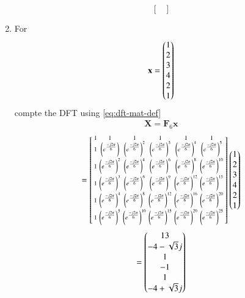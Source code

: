 \documentclass[journal,12pt,twocolumn]{IEEEtran}
\let\vec\mathbf
\renewcommand\thesection{\arabic{section}}
\begin{document}
\begin{enumerate}[label=\arabic*.,ref=\thesection.\theenumi]
\begin{equation}
\begin{bmatrix}
		\end{bmatrix}
	\end{equation}
	\item For 
	\begin{align}
		\vec{x} = \myvec{1\\2\\3\\4\\2\\1}
		\label{eq:equation1}
	\end{align}
	compte the DFT  
	using 
	\eqref{eq:dft-mat-def}\\
	\solution
	\begin{align}
		\vec{X} = \vec{F}_6 \vec{x}
	\end{align}	
	\begin{align}
		= \begin{bsmallmatrix}
			1	&	1	&	1	&	1	&	1	&	1\\
			1	&	\left(e^{\frac{-j2\pi}{6}}\right)	&	\left(e^{\frac{-j2\pi}{6}}\right)^2	&	\left(e^{\frac{-j2\pi}{6}}\right)^3	&	\left(e^{\frac{-j2\pi}{6}}\right)^4	&	\left(e^{\frac{-j2\pi}{6}}\right)^5\\
			1	&	\left(e^{\frac{-j2\pi}{6}}\right)^2	&	\left(e^{\frac{-j2\pi}{6}}\right)^4	&	\left(e^{\frac{-j2\pi}{6}}\right)^6	&	\left(e^{\frac{-j2\pi}{6}}\right)^8	&	\left(e^{\frac{-j2\pi}{6}}\right)^{10}\\
			1	&	\left(e^{\frac{-j2\pi}{6}}\right)^3	&	\left(e^{\frac{-j2\pi}{6}}\right)^6	&	\left(e^{\frac{-j2\pi}{6}}\right)^9	&	\left(e^{\frac{-j2\pi}{6}}\right)^{12}	&	\left(e^{\frac{-j2\pi}{6}}\right)^{15}\\
			1	&	\left(e^{\frac{-j2\pi}{6}}\right)^4	&	\left(e^{\frac{-j2\pi}{6}}\right)^8	&	\left(e^{\frac{-j2\pi}{6}}\right)^{12}	&	\left(e^{\frac{-j2\pi}{6}}\right)^{16}	&	\left(e^{\frac{-j2\pi}{6}}\right)^{20}\\
			1	&	\left(e^{\frac{-j2\pi}{6}}\right)^5	&	\left(e^{\frac{-j2\pi}{6}}\right)^{10}	&	\left(e^{\frac{-j2\pi}{6}}\right)^{15}	&	\left(e^{\frac{-j2\pi}{6}}\right)^{20}	&	\left(e^{\frac{-j2\pi}{6}}\right)^{25}
		\end{bsmallmatrix}
		\begin{pmatrix}1\\2\\3\\4\\2\\1\end{pmatrix}
	\end{align}
	\begin{align}
		=\myvec{13\\-4 - \sqrt{3}j\\ 1\\-1\\1\\-4 + \sqrt{3}j}

\end{align}
\end{enumerate}
\end{document}
